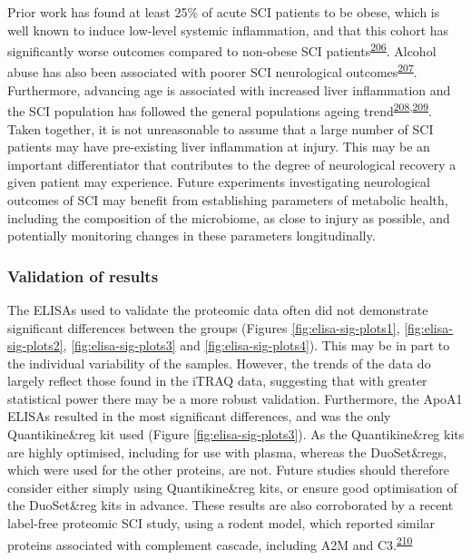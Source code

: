 \documentclass[
]{article}
\begin{document}
Prior work has found at least 25\% of acute SCI patients to be obese, which is well known to induce low-level systemic inflammation, and that this cohort has significantly worse outcomes compared to non-obese SCI patients\textsuperscript{\protect\hyperlink{ref-stenson_obesity_2011}{206}}.
Alcohol abuse has also been associated with poorer SCI neurological outcomes\textsuperscript{\protect\hyperlink{ref-elliot_alcohol_2002}{207}}.
Furthermore, advancing age is associated with increased liver inflammation and the SCI population has followed the general populations ageing trend\textsuperscript{\protect\hyperlink{ref-bertolotti_nonalcoholic_2014}{208},\protect\hyperlink{ref-chen_changing_2016}{209}}.
Taken together, it is not unreasonable to assume that a large number of SCI patients may have pre-existing liver inflammation at injury.
This may be an important differentiator that contributes to the degree of neurological recovery a given patient may experience.
Future experiments investigating neurological outcomes of SCI may benefit from establishing parameters of metabolic health, including the composition of the microbiome, as close to injury as possible, and potentially monitoring changes in these parameters longitudinally.

\hypertarget{validation-of-results}{%
\subsubsection{Validation of results}\label{validation-of-results}}

The ELISAs used to validate the proteomic data often did not demonstrate significant differences between the groups (Figures \ref{fig:elisa-sig-plots1}, \ref{fig:elisa-sig-plots2}, \ref{fig:elisa-sig-plots3} and \ref{fig:elisa-sig-plots4}).
This may be in part to the individual variability of the samples.
However, the trends of the data do largely reflect those found in the iTRAQ data, suggesting that with greater statistical power there may be a more robust validation.
Furthermore, the ApoA1 ELISAs resulted in the most significant differences, and was the only Quantikine\&reg kit used (Figure \ref{fig:elisa-sig-plots3}).
As the Quantikine\&reg kits are highly optimised, including for use with plasma, whereas the DuoSet\&regs, which were used for the other proteins, are not.
Future studies should therefore consider either simply using Quantikine\&reg kits, or ensure good optimisation of the DuoSet\&reg kits in advance.
These results are also corroborated by a recent label-free proteomic SCI study, using a rodent model, which reported similar proteins associated with complement cascade, including A2M and C3.\textsuperscript{\protect\hyperlink{ref-yao_proteomics_2021}{210}}
\end{document}
